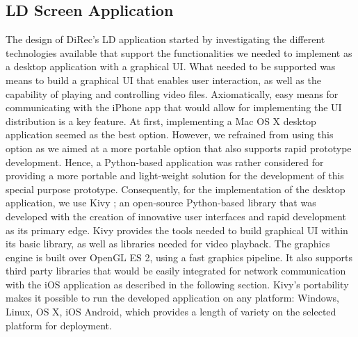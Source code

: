\subsection{LD Screen Application}
The design of DiRec's LD application started by investigating the different
technologies available that support the functionalities we needed to implement
as a desktop application with a graphical UI. What needed to be supported was
means to build a graphical UI that enables user interaction, as well as the
capability of playing and controlling video files. Axiomatically, easy means for
communicating with the iPhone app that would allow for implementing the UI
distribution is a key feature. At first, implementing a Mac OS X desktop
application seemed as the best option. However, we refrained from using this
option as we aimed at a more portable option that also supports rapid prototype
development. Hence, a Python-based application was rather considered for
providing a more portable and light-weight solution for the development of this
special purpose prototype. Consequently, for the implementation of the desktop
application, we use Kivy \cite{kivyDoc}; an open-source Python-based library that was
developed with the creation of innovative user interfaces and rapid development as its primary edge. Kivy provides the tools needed to build graphical UI within its basic library, as well as libraries needed for video playback. The graphics engine is built over OpenGL ES 2, using a fast graphics pipeline. It also supports third party libraries that would be easily integrated for network communication with the iOS application as described in the following section. Kivy's portability makes it possible to run the developed application on any platform: Windows, Linux, OS X, iOS Android, which provides a length of variety on the selected platform for deployment.
 
